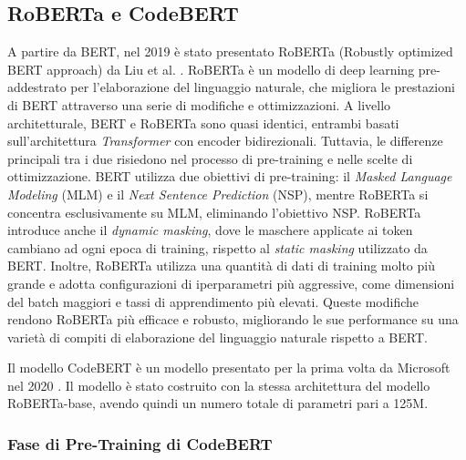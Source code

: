 \documentclass[../../Thesis.tex]{subfiles}
\begin{document}
\subsection{RoBERTa e CodeBERT}
A partire da BERT, nel 2019 \`e stato presentato RoBERTa (Robustly optimized BERT approach) da Liu et al. \cite{RoBERTa}. RoBERTa \`e un modello di deep learning pre-addestrato per l'elaborazione del linguaggio naturale, che migliora le prestazioni di BERT attraverso una serie di modifiche e ottimizzazioni. A livello architetturale, BERT e RoBERTa sono quasi identici, entrambi basati sull'architettura \textit{Transformer} con encoder bidirezionali. Tuttavia, le differenze principali tra i due risiedono nel processo di pre-training e nelle scelte di ottimizzazione. BERT utilizza due obiettivi di pre-training: il \textit{Masked Language Modeling} (MLM) e il \textit{Next Sentence Prediction} (NSP), mentre RoBERTa si concentra esclusivamente su MLM, eliminando l'obiettivo NSP. RoBERTa introduce anche il \textit{dynamic masking}, dove le maschere applicate ai token cambiano ad ogni epoca di training, rispetto al \textit{static masking} utilizzato da BERT. Inoltre, RoBERTa utilizza una quantit\`a di dati di training molto pi\`u grande e adotta configurazioni di iperparametri pi\`u aggressive, come dimensioni del batch maggiori e tassi di apprendimento pi\`u elevati. Queste modifiche rendono RoBERTa pi\`u efficace e robusto, migliorando le sue performance su una variet\`a di compiti di elaborazione del linguaggio naturale rispetto a BERT.


Il modello CodeBERT \`e un modello presentato per la prima volta da Microsoft nel 2020 \cite{CodeBERT}. Il modello \`e stato costruito con la stessa architettura del modello RoBERTa-base, avendo quindi un numero totale di parametri pari a 125M. 
 

\subsubsection{Fase di Pre-Training di CodeBERT}
\end{document}
